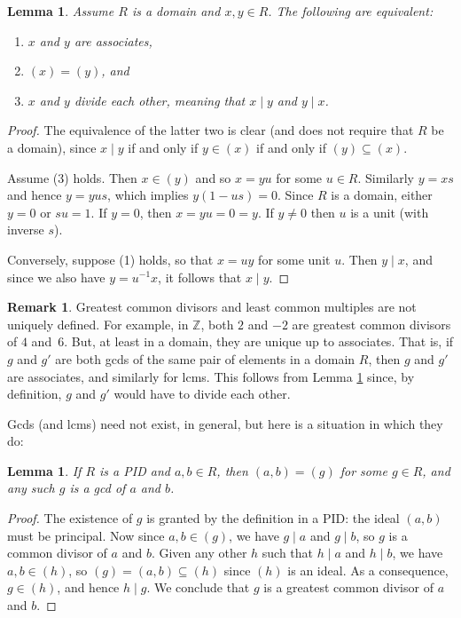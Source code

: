 \documentclass[12pt]{report}
\newtheorem{lemma}[theorem]{Lemma}
\numberwithin{equation}{section}
\numberwithin{theorem}{chapter}
\theoremstyle{definition}
\newtheorem*{basic properties}{Basic Properties}
\newtheorem*{Important Remark}{Important Remark}
\newtheorem{remark}[theorem]{Remark}
\begin{document}
\begin{lemma}\label{lemma associates}
  Assume $R$ is a domain and $x, y \in R$. The following are equivalent:
  \begin{enumerate}
  \item  $x$ and $y$ are associates,
  \item $(x) = (y)$, and
  \item $x$ and $y$ divide each other, meaning that $x \mid y$ and $y \mid x$. 
    \end{enumerate}
\end{lemma}

\begin{proof}
The equivalence of the latter two is clear (and does not require that $R$ be a domain), since $x \mid y$ if and only if $y \in (x)$ if and only if $(y) \subseteq (x)$.

Assume (3) holds. Then $x \in (y)$ and so $x = yu$ for some $u \in R$.  Similarly $y = xs$ and hence $y = yus$, which implies $y(1-us)=0$. 
Since $R$ is a domain, either $y = 0$ or $su = 1$. If $y = 0$, then $x = yu = 0 = y$. If $y \neq 0$ then    $u$ is  a unit (with inverse $s$). 

Conversely, suppose (1) holds, so that $x = uy$ for some unit $u$. Then $y \mid x$, and since we also have $y = u^{-1}x$, it follows that $x \mid y$. 
\end{proof}




\begin{remark} \label{remark uniqueness of gcds}
  Greatest common divisors and least common multiples are not uniquely defined. For example, in $\mathbb{Z}$, both $2$ and $-2$ are greatest common divisors of $4$ and~$6$.
  But, at least  in a domain, they are unique up to associates. That is, if $g$ and $g'$ are both gcds of the same pair of elements in a domain $R$, then $g$
  and $g'$ are associates, and similarly for lcms. This follows from Lemma \ref{lemma associates} since, by definition, $g$ and $g'$ would have to divide each other.
\end{remark}

Gcds (and lcms) need not exist, in general, but here is a situation in which they do:

\begin{lemma}\label{pid gcds}
If $R$ is a PID and $a,b\in R$, then  $(a,b) = (g)$ for some $g \in R$, and any such $g$ is a gcd of $a$ and $b$.
\end{lemma}
 
 
 \begin{proof}
   The existence of $g$ is granted by the definition in a PID: the ideal $(a,b)$ must be principal.
   Now since $a, b \in (g)$, we have $g \mid a$ and $g\mid b$, so $g$ is a common divisor of $a$ and $b$.
   Given any other $h$ such that $h \mid a$ and $h \mid b$, we have $a,b\in (h)$, so $(g)=(a,b)\subseteq (h)$ since $(h)$ is an ideal.
   As a consequence, $g \in (h)$, and hence $h \mid g$. We conclude that $g$ is a greatest common divisor of $a$ and $b$.
\end{proof}
\end{document}

